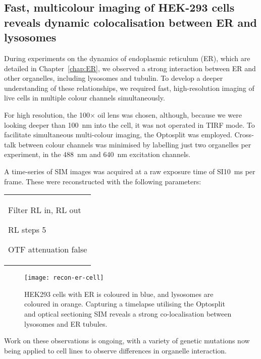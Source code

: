 \subsection{Fast, multicolour imaging of HEK-293 cells reveals dynamic colocalisation between ER and lysosomes}
During experiments on the dynamics of endoplasmic reticulum (ER), which are detailed in Chapter~\ref{chap:ER}, we observed a strong interaction between ER and other organelles, including lysosomes and tubulin. 
To develop a deeper understanding of these relationships, we required fast, high-resolution imaging of live cells in multiple colour channels simultaneously. 

For high resolution, the 100$\times$ oil lens was chosen, although, because we were looking deeper than \SI{100}{\nano\metre} into the cell, it was not operated in TIRF mode. 
To facilitate simultaneous multi-colour imaging, the Optosplit was employed. 
Cross-talk between colour channels was minimised by labelling just two organelles per experiment, in the \SI{488}{\nano\metre} and \SI{640}{\nano\metre} excitation channels. 

A time-series of SIM images was acquired at a raw exposure time of SI\SI{10}{\milli\second} per frame. 
These were reconstructed with the following parameters: \newline
\begin{tabular}{p{}}
\begin{labelling}[margin=OTF attenuation]
	\item[Filter] RL in, RL out
	\item[RL steps] 5
	\item[OTF attenuation] false
\end{labelling}
\end{tabular}

\begin{figure}[tbp!]
\centering
\texttt{[image: recon-er-cell]}
\caption[LAG SIM: Fast, multi-colour imaging of ER in cells reveals co-localisation between lysosomes and ER tubules]{HEK293 cells with ER is coloured in blue, and lysosomes are coloured in orange. Capturing a timelapse utilising the Optosplit and optical sectioning SIM reveals a strong co-localisation between lysosomes and ER tubules. }
\label{fig:recon-er-cell}
\end{figure}

Work on these observations is ongoing, with a variety of genetic mutations now being applied to cell lines to observe differences in organelle interaction. 


